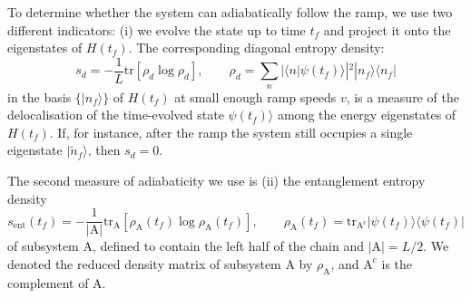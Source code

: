 \documentclass{SciPost}
\newcommand\0{\scalebox{-1}[1]{0}}
\begin{document}
To determine whether the system can adiabatically follow the ramp, we use two different indicators: (i) we evolve the state up to time $t_f$ and project it onto the eigenstates of $H(t_f)$. The corresponding diagonal entropy density:
\begin{equation}
s_d = -\frac{1}{L}\mathrm{tr}\left[\rho_d\log\rho_d\right], \qquad \rho_d=\sum_n |\langle n|\psi(t_f)\rangle|^2 |n_f\rangle\langle n_f|
\end{equation}
in the basis $\{|n_f\rangle\}$ of $H(t_f)$ at small enough ramp speeds $v$, is a measure of the delocalisation of the time-evolved state $\psi(t_f)\rangle$ among the energy eigenstates of $H(t_f)$. If, for instance, after the ramp the system still occupies a single eigenstate $|\tilde n_f\rangle$, then $s_d=0$.

The second measure of adiabaticity we use is (ii) the entanglement entropy density
\begin{equation}
s_\mathrm{ent}(t_f) = -\frac{1}{|\mathrm{A}|}\mathrm{tr}_{\mathrm{A}}\left[\rho_\mathrm{A}(t_f)\log\rho_\mathrm{A}(t_f)\right], \qquad \rho_\mathrm{A}(t_f) = \mathrm{tr}_{\mathrm{A^c}} |\psi(t_f)\rangle\langle\psi(t_f)|
\end{equation}
of subsystem A, defined to contain the left half of the chain and $|\mathrm{A}|=L/2$. We denoted the reduced density matrix of subsystem A by $\rho_\mathrm{A}$, and $\mathrm{A^c}$ is the complement of A.
\end{document}
